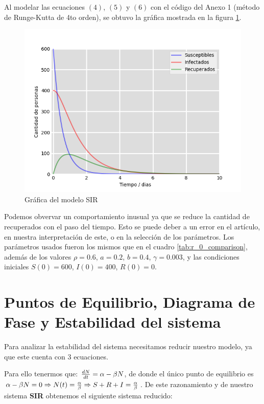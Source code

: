 \documentclass{article}
\begin{document}
Al modelar las ecuaciones $(4)$, $(5)$ y $(6)$ con el c\'odigo del Anexo 1 (m\'etodo de Runge-Kutta de 4to orden), se obtuvo la gr\'afica mostrada en la figura \ref{fig:model_graph}.

\begin{figure}[H]
    \centering
    \includegraphics[width=1\textwidth]{./images/Figure_1.png}
    \caption{Gr\'afica del modelo SIR}
    \label{fig:model_graph}
\end{figure}

Podemos obvervar un comportamiento inusual ya que se  reduce la cantidad de recuperados con el paso del tiempo. Esto se puede deber a un error en el art\'iculo, en nuestra interpretaci\'on de este, o en la selecci\'on de los par\'ametros. Los par\'ametros usados fueron los mismos que en el cuadro \ref{tab:r_0_comparison}, adem\'as de los valores $\rho=0.6$, $a=0.2$, $b=0.4$, $\gamma=0.003$, y las condiciones iniciales $S(0)=600$, $I(0)=400$, $R(0)=0$.

\section{Puntos de Equilibrio, Diagrama de Fase y Estabilidad del sistema}

Para analizar la estabilidad del sistema necesitamos reducir nuestro modelo, ya que este cuenta con 3 ecuaciones. 

Para ello tenermos que: ${dN\over dt}=\alpha-\beta N$, de donde el único punto de equilibrio es $\alpha-\beta N=0\Rightarrow N(t)={\alpha\over\beta}\Rightarrow S+R+I={\alpha\over\beta}$. De este razonamiento y de nuestro sistema \textbf{SIR} obtenemos el siguiente sistema reducido:
\end{document}

